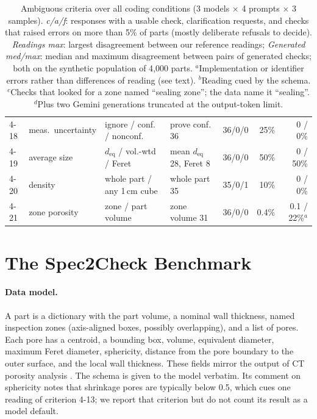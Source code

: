 \documentclass[letterpaper]{article} %
\begin{document}
\begin{table}[t]
\begin{tabular}{@{}lllllrr@{}}
4-18 & meas.\ uncertainty & ignore / conf. / nonconf. & prove conf. 36 & 36/0/0 & 25\% & 0 / 0\% \\
4-19 & average size & $d_\mathrm{eq}$ / vol.-wtd / Feret & mean $d_\mathrm{eq}$ 28, Feret 8 & 36/0/0 & 50\% & 0 / 50\% \\
4-20 & density & whole part / any 1\,cm cube & whole part 35 & 35/0/1 & 10\% & 0 / 0\% \\
4-21 & zone porosity & zone / part volume & zone volume 31 & 36/0/0 & 0.4\% & 0.1 / 22\%$^a$ \\
\bottomrule
\end{tabular}
\caption{Ambiguous criteria over all coding conditions (3 models $\times$ 4 prompts $\times$ 3 samples). \emph{c/a/f}: responses with a usable check, clarification requests, and checks that raised errors on more than 5\% of parts (mostly deliberate refusals to decide). \emph{Readings max}: largest disagreement between our reference readings; \emph{Generated med/max}: median and maximum disagreement between pairs of generated checks; both on the synthetic population of 4{,}000 parts. $^a$Implementation or identifier errors rather than differences of reading (see text). $^b$Reading cued by the schema. $^c$Checks that looked for a zone named ``sealing zone''; the data name it ``sealing''. $^d$Plus two Gemini generations truncated at the output-token limit.}
\label{tab:readings}
\end{table}

\section{The Spec2Check Benchmark}
\paragraph{Data model.} A part is a dictionary with the part volume, a nominal wall thickness, named inspection zones (axis-aligned boxes, possibly overlapping), and a list of pores. Each pore has a centroid, a bounding box, volume, equivalent diameter, maximum Feret diameter, sphericity, distance from the pore boundary to the outer surface, and the local wall thickness. These fields mirror the output of CT porosity analysis \cite{vgporosity}. The schema is given to the model verbatim. Its comment on sphericity notes that shrinkage pores are typically below 0.5, which cues one reading of criterion 4-13; we report that criterion but do not count its result as a model default.
\end{document}
